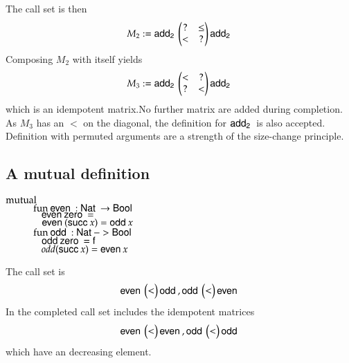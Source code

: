 \noindent The call set is then 
\[
M_2 := \mathsf{add_2}\:\begin{pmatrix}

? & \leq \\
< & ?   \\
\end{pmatrix}\mathsf{add_2}\:
\]
Composing $M_2$ with itself yields
\[
M_3 := \mathsf{add_2}\: \begin{pmatrix}
< & ?    \\
? & <    \\
\end{pmatrix} \mathsf{add_2}\:
\] 
which is an idempotent matrix.No further matrix are added during completion.
As $M_3$ has an $<$ on the diagonal, the definition for $\mathsf{add_2}\:$ is also accepted.
Definition with permuted arguments are a strength of the size-change principle.  

\subsection{A mutual definition}

\begin{bsp}
$\mathrm{mutual}\:$\\
$\spcx \fun \even : \Nat \ra \Bool$\\
$\spcx \spc \even \zero = \tt $\\
$\spcx \spc \even (\suc x) = \odd x $\\
$\spcx \fun \odd : \Nat -> \Bool$\\
$\spcx \spc \odd \zero = \ff$\\
$\spcx \spc  odd (\suc x) = \even x$
\end{bsp}
The call set is 
\[
\mathsf{even}\: \begin{pmatrix}
< \\
\end{pmatrix}\mathsf{odd}\:
, 
\mathsf{odd}\: \begin{pmatrix}
< \\
\end{pmatrix}\mathsf{even}\:
\] 
In the completed call set includes the idempotent matrices
\[
\mathsf{even}\: \begin{pmatrix}
< \\
\end{pmatrix}\mathsf{even}\:
, 
\mathsf{odd}\: \begin{pmatrix}
< \\
\end{pmatrix}\mathsf{odd}\:
\] 
which have an decreasing element.

